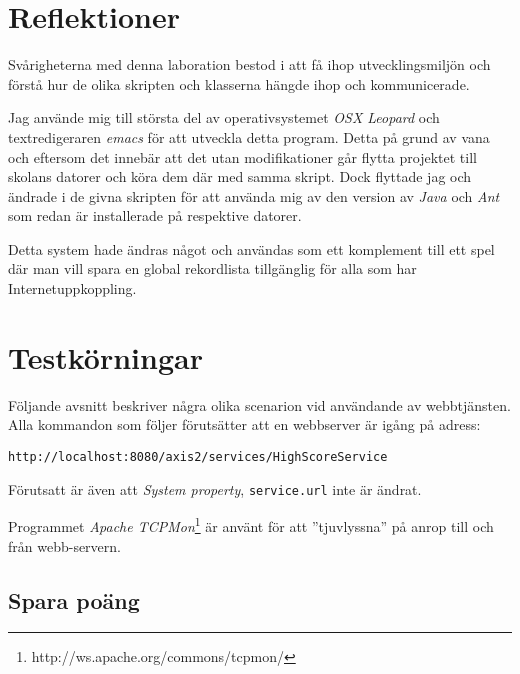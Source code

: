\documentclass[a4paper, 12pt]{article}
\begin{document}
\section{Reflektioner}\label{Reflektioner}

Svårigheterna med denna laboration bestod i att få ihop
utvecklingsmiljön och förstå hur de olika skripten och klasserna
hängde ihop och kommunicerade.

Jag använde mig till största del av operativsystemet \textit{OSX
  Leopard} och textredigeraren \textit{emacs} för att utveckla detta
program. Detta på grund av vana och eftersom det innebär att det utan
modifikationer går flytta projektet till skolans datorer och köra dem
där med samma skript. Dock flyttade jag och ändrade i de givna
skripten för att använda mig av den version av \textit{Java} och
\textit{Ant} som redan är installerade på respektive datorer.

Detta system hade ändras något och användas som ett komplement till
ett spel där man vill spara en global rekordlista tillgänglig för alla
som har Internetuppkoppling.

\section{Testkörningar}\label{Testkorningar}
Följande avsnitt beskriver några olika scenarion vid användande av
webbtjänsten. Alla kommandon som följer förutsätter att en webbserver
är igång på adress:
\begin{footnotesize}
\verb!http://localhost:8080/axis2/services/HighScoreService!
\end{footnotesize}

Förutsatt är även att \textit{System property}, \verb!service.url!
inte är ändrat.

Programmet \textit{Apache
  TCPMon}\footnote{http://ws.apache.org/commons/tcpmon/} är använt för
att ''tjuvlyssna'' på anrop till och från webb-servern.

\subsection{Spara poäng}\label{sec:spara}
\end{document}
